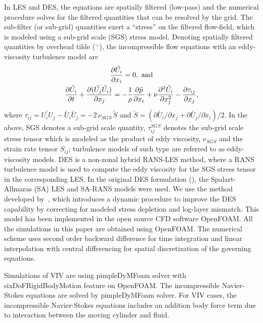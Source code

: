In LES and DES, the equations are spatially filtered (low-pass) and the
numerical procedure solves for the filtered quantities that can be resolved by
the grid. The sub-filter (or sub-grid) quantities exert a ``stress'' on the
filtered flow-field, which is modeled using a sub-grid scale (SGS) stress
model. Denoting spatially filtered quantities by overhead tilde ($^\sim$), the
incompressible flow equations with an eddy-viscosity turbulence model are
%
\begin{gather*}
  \frac{\partial{\tilde{U_i}}}{\partial{x_i}}=0,~{\rm and} \\
   \frac{\partial{\tilde{U_i}}}{\partial{t}}+
   \frac{\partial{(\tilde{U_j}\tilde{U_i})}}{\partial{x_j}}
   =-\frac{1}{\rho}\frac{\partial{\tilde{p}}}{\partial{x_i}}+\nu\frac{\partial{^2\tilde{U_i}}}{\partial{x_j^2}}-\frac{\partial{\tau_{ij}}}{\partial{x_j}}, \\
 \label{eq:geqs}
\end{gather*}
%
where $\tau_{ij} = \widetilde{U_i U_j}-\tilde{U_i}\tilde{U_j} = -2 \, \nu_{SGS}
\, \tilde{S}$ and $\tilde{S} = (\partial{\tilde{U_i}}/\partial{x_j} +
\partial{\tilde{U_j}}/\partial{x_i})/2$.  In the above, SGS denotes a sub-grid
scale quantity, $\tau_{ij}^{SGS}$ denotes the sub-grid scale stress tensor
which is modeled as the product of eddy viscosity, $\nu_{SGS}$ and the strain
rate tensor $S_{ij}$; turbulence models of such type are referred to as
eddy-viscosity models. DES is a non-zonal hybrid RANS-LES method, where a RANS
turbulence model is used to compute the eddy viscosity for the SGS stress
tensor in the corresponding LES. In the original DES formulation
(\cite{spalart1997comments}), the Spalart-Allmaras (SA) LES and SA-RANS models
were used. We use the method developed by~\cite{yin2015dynamic}, which
introduces a dynamic procedure to improve the DES capability by correcting for
modeled stress depletion and log-layer mismatch. This model has been
implemented in the open source CFD software OpenFOAM. All the simulations in
this paper are obtained using OpenFOAM. The numerical scheme uses second order
backward difference for time integration and linear interpolation with central
differencing for spatial discretization of the governing equations.

Simulations of VIV are using pimpleDyMFoam solver with sixDoFRigidBodyMotion
feature on OpenFOAM. The incompressible Navier-Stokes equations are solved by
pimpleDyMFoam solver. For VIV cases, the incompressible Navier-Stokes equations
includes an addition body force term due to interaction between the moving
cylinder and fluid. 

